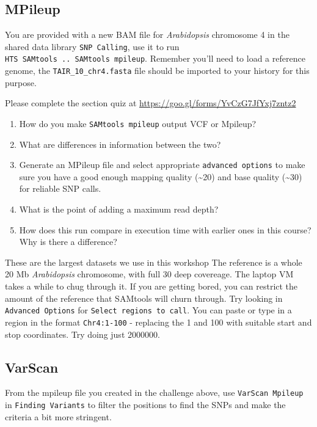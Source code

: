\documentclass[12pt,]{book}
\providecommand{\tightlist}{%
  \setlength{\itemsep}{0pt}\setlength{\parskip}{0pt}}
\theoremstyle{definition}
\theoremstyle{definition}
\theoremstyle{remark}
\begin{document}
\subsection{MPileup}\label{mpileup-1}

You are provided with a new BAM file for \emph{Arabidopsis} chromosome 4
in the shared data library \texttt{SNP\ Calling}, use it to run
\texttt{HTS\ SAMtools\ ..\ SAMtools\ mpileup}. Remember you'll need to
load a reference genome, the \texttt{TAIR\_10\_chr4.fasta} file should
be imported to your history for this purpose.

Please complete the section quiz at
\url{https://goo.gl/forms/YvCzG7JfYxj7zntz2}

\begin{enumerate}
\def\labelenumi{\arabic{enumi}.}
\tightlist
\item
  How do you make \texttt{SAMtools\ mpileup} output VCF or Mpileup?
\item
  What are differences in information between the two?
\item
  Generate an MPileup file and select appropriate
  \texttt{advanced\ options} to make sure you have a good enough mapping
  quality (\textasciitilde{}20) and base quality (\textasciitilde{}30)
  for reliable SNP calls.
\item
  What is the point of adding a maximum read depth?
\item
  How does this run compare in execution time with earlier ones in this
  course? Why is there a difference?
\end{enumerate}

These are the largest datasets we use in this workshop The reference is
a whole 20 Mb \emph{Arabidopsis} chromosome, with full 30 deep
covereage. The laptop VM takes a while to chug through it. If you are
getting bored, you can restrict the amount of the reference that
SAMtools will churn through. Try looking in \texttt{Advanced\ Options}
for \texttt{Select\ regions\ to\ call}. You can paste or type in a
region in the format \texttt{Chr4:1-100} - replacing the 1 and 100 with
suitable start and stop coordinates. Try doing just 2000000.

\subsection{VarScan}\label{varscan}

From the mpileup file you created in the challenge above, use
\texttt{VarScan\ Mpileup} in \texttt{Finding\ Variants} to filter the
positions to find the SNPs and make the criteria a bit more stringent.
\end{document}

